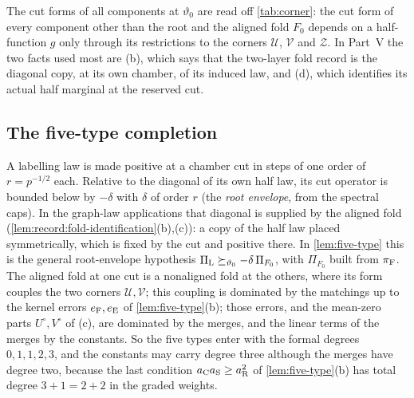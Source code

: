 The cut forms of all components at $\vartheta_0$ are read off
\cref{tab:corner}: the cut form of every component other than the root and the
aligned fold $F_0$ depends on a half-function $g$ only through its
restrictions to the corners $\mathcal U$, $\mathcal V$ and $\mathcal Z$.
In Part~V the two facts used most are (b), which says that the two-layer fold
record is the diagonal copy, at its own chamber, of its induced law, and (d),
which identifies its actual half marginal at the reserved cut.

\subsection{The five-type completion}\label{subsec:five-type}

A labelling law is made positive at a chamber cut in steps of one order of
$r=p^{-1/2}$ each. Relative to the diagonal of its own half law, its cut
operator is bounded below by $-\delta$ with $\delta$ of order $r$ (the
\emph{root envelope}, from the spectral caps). In the graph-law
applications that diagonal is supplied by the aligned fold
(\cref{lem:record:fold-identification}(b),(c)): a copy of the half law
placed symmetrically, which is fixed by the cut and positive there. In
\cref{lem:five-type} this is the general root-envelope hypothesis
$\Pi_{\rm L}\succeq_{\vartheta_0}-\delta\,\Pi_{F_0}$, with $\Pi_{F_0}$
built from $\pi_{\rm F}$. The aligned fold at one cut is a nonaligned
fold at the others, where its form couples the two corners
$\mathcal U,\mathcal V$; this coupling is dominated by the matchings up to the kernel
errors $e_{\rm F},e_{\rm E}$ of \cref{lem:five-type}(b); those errors, and
the mean-zero parts $U^\circ,V^\circ$ of (c), are dominated by the merges,
and the linear terms of the merges by the constants. So the
five types enter with the formal degrees $0,1,1,2,3$, and the constants may
carry degree three although the merges have degree two, because the last
condition $a_{\rm C}a_{\rm S}\ge a_{\rm R}^2$ of \cref{lem:five-type}(b)
has total degree $3+1=2+2$ in the graded weights.

